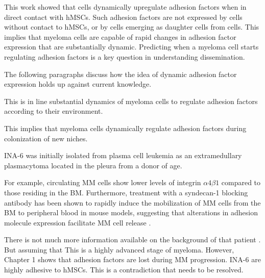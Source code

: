 

%
\label{sec:discussion_dynamic_regulation}%


This work showed that \INA cells dynamically upregulate adhesion factors when in
direct contact with \acp{hMSC}. Such adhesion factors are not expressed by \INA
cells without contact to \acp{hMSC}, or by \INA cells emerging as daughter cells
from \MAina cells. This implies that myeloma cells are capable of rapid changes in
adhesion factor expression that are substantially dynamic.
Predicting when a myeloma cell starts regulating adhesion factors is a key
question in understanding dissemination.

The following paragraphs
discuss how the idea of dynamic adhesion factor expression holds up
against current knowledge.



This is in line
substantial dynamics of
myeloma cells to regulate adhesion factors according to their environment.



This implies that myeloma cells
dynamically regulate adhesion factors during colonization of new niches.




INA-6 was initially isolated from plasma cell leukemia as an extramedullary
plasmacytoma located in the pleura from a donor of age.





For example,
circulating MM cells show lower levels of integrin $\alpha4\beta1$
compared to those residing in the BM. Furthermore, treatment with a syndecan-1 blocking antibody
has been shown to rapidly induce the mobilization of MM cells from the BM to
peripheral blood in mouse models, suggesting that alterations in adhesion
molecule expression facilitate MM cell release
\cite{zeissigTumourDisseminationMultiple2020}.



There is not much more information available on the background of that patient \cite{TwoNewInterleukin6,burgerGp130RasMediated2001}.
But assuming that
This is a highly advanced
stage of myeloma.
However,  Chapter 1 shows that adhesion factors are
lost during MM progression. INA-6 are highly adhesive to hMSCs.
This is a contradiction that needs to be resolved.





